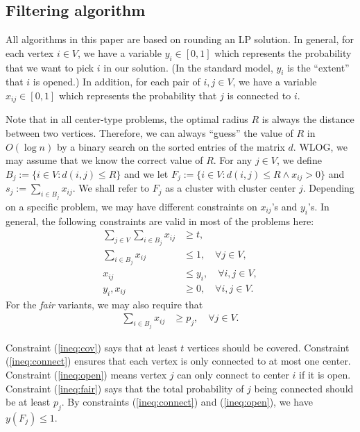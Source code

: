 \documentclass[a4paper,11pt]{article}
\begin{document}
\subsection{Filtering algorithm}
All algorithms in this paper are based on rounding an LP solution. In general, for each vertex $i \in V$, we have a variable $y_i \in [0,1]$ which represents the probability that we want to pick $i$ in our solution. (In the standard model, $y_i$ is the ``extent'' that $i$ is opened.) In addition, for each pair of $i,j \in V$, we have a variable $x_{ij} \in [0,1]$ which represents the probability that $j$ is connected to $i$. 

Note that in all center-type problems, the optimal radius $R$ is always the distance between two vertices. Therefore, we can always ``guess'' the value of $R$ in $O(\log n)$ by a binary search on the sorted entries of the matrix $d$. WLOG, we may assume that we know the correct value of $R$.  For any $j \in V$, we define $B_j := \{ i \in V: d(i,j) \leq R \}$ and we let $F_j := \{i \in V: d(i,j) \leq R \wedge x_{ij} > 0\}$ and $s_j := \sum_{i \in B_j} x_{ij}$. We shall refer to $F_j$ as a cluster with cluster center $j$. Depending on a specific problem, we may have different constraints on $x_{ij}$'s and $y_i$'s. In general, the following constraints are valid in most of the problems here:
{\allowdisplaybreaks
\begin{align}
	\sum_{j \in V} \sum_{i \in B_j} x_{ij} &\geq t,  \label{ineq:cov} \\
	\sum_{i \in B_j} x_{ij} &\leq 1, \quad \forall j \in V, \label{ineq:connect} \\
	x_{ij} &\leq y_i,  \label{ineq:open} \quad \forall i,j \in V, \\
	y_i, x_{ij} &\geq 0,  \quad \forall i,j \in V. \label{ineq:nonneg}
\end{align}
}
For the \emph{fair} variants, we may also require that
\begin{align}
	\sum_{i \in B_j} x_{ij} &\geq p_j, \quad \forall j \in V. \label{ineq:fair} 
\end{align}



Constraint (\ref{ineq:cov}) says that at least $t$ vertices should be covered. Constraint (\ref{ineq:connect}) ensures that each vertex is only connected to at most one center. Constraint (\ref{ineq:open}) means vertex $j$ can only connect to center $i$ if it is open. Constraint (\ref{ineq:fair}) says that the total probability of $j$ being connected should be at least $p_j$. By constraints (\ref{ineq:connect}) and (\ref{ineq:open}), we have $y(F_j) \leq 1$.
\end{document}
